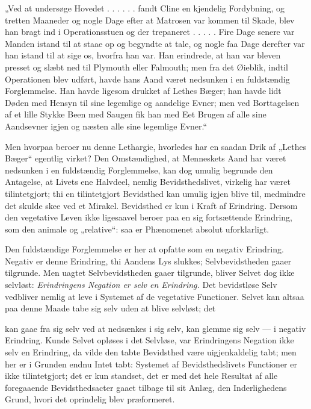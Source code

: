 \documentclass[12pt,a4paper]{book}
\begin{document}
„Ved at undersøge Hovedet . . . . . . fandt Cline en kjendelig Fordybning,
og tretten Maaneder og nogle Dage efter at Matrosen var kommen til Skade,
blev han bragt ind i Operationsstuen og der trepaneret . . . . . Fire Dage
senere var Manden istand til at staae op og begyndte at tale, og nogle faa
Dage derefter var han istand til at sige os, hvorfra han var. Han
erindrede, at han var bleven presset og slæbt ned til Plymouth eller
Falmouth; men fra det Øieblik, indtil Operationen blev udført, havde hans
Aand været nedsunken i en fuldstændig Forglemmelse. Han havde ligesom
drukket af Lethes Bæger; han havde lidt Døden med Hensyn til sine
legemlige og aandelige Evner; men ved Borttagelsen af et lille Stykke Been
med Saugen fik han med Eet Brugen af alle sine Aandsevner igjen og næsten
alle sine legemlige Evner.“

Men hvorpaa beroer nu denne Lethargie, hvorledes har en saadan Drik af
„Lethes Bæger“ egentlig virket? Den Omstændighed, at Menneskets Aand har
været nedsunken i en fuldstændig Forglemmelse, kan dog umulig begrunde den
Antagelse, at Livets ene Halvdeel, nemlig Bevidsthedslivet, virkelig har
været tilintetgjort; thi en tilintetgjort Bevidsthed kan umulig igjen
blive til, medmindre det skulde skee ved et Mirakel. Bevidsthed er kun i
Kraft af Erindring. Dersom den vegetative Leven ikke ligesaavel beroer paa
en sig fortsættende Erindring, som den animale og „relative“: saa er
Phænomenet absolut uforklarligt.

Den fuldstændige Forglemmelse er her at opfatte som en negativ Erindring.
Negativ er denne Erindring, thi Aandens Lys slukkes; Selvbevidstheden
gaaer tilgrunde. Men uagtet Selvbevidstheden gaaer tilgrunde, bliver
Selvet dog ikke selvløst: \emph{Erindringens Negation er selv en
Erindring.} Det bevidstløse Selv vedbliver nemlig at leve i Systemet af de
vegetative Functioner. Selvet kan altsaa paa denne Maade tabe sig selv
uden at blive selvløst; det

kan gaae fra sig selv ved at nedsænkes i sig selv, kan glemme sig selv ---
i negativ Erindring. Kunde Selvet opløses i det Selvløse, var Erindringens
Negation ikke selv en Erindring, da vilde den tabte Bevidsthed være
uigjenkaldelig tabt; men her er i Grunden endnu Intet tabt: Systemet af
Bevidsthedslivets Functioner er ikke tilintetgjort; det er kun standset,
det er med det hele Resultat af alle foregaaende Bevidsthedsacter gaaet
tilbage til sit Anlæg, den Inderlighedens Grund, hvori det oprindelig blev
præformeret.
\end{document}
